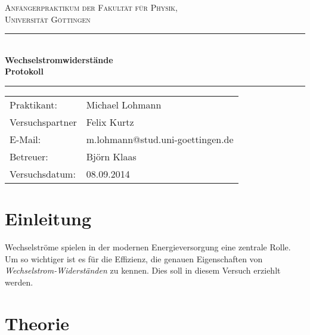\documentclass[12pt,a4paper,titlepage,headinclude,bibtotoc]{scrartcl}
\begin{document}
\begin{titlepage}
\centering
\textsc{\Large Anfängerpraktikum der Fakultät für
  Physik,\\[1.5ex] Universität Göttingen}

\vspace*{4.2cm}

\rule{\textwidth}{1pt}\\[0.5cm]
{\huge \bfseries
  Wechselstromwiderstände\\[1.5ex]
  Protokoll}\\[0.5cm]
\rule{\textwidth}{1pt}

\vspace*{2.5cm}

\begin{Large}
\begin{tabular}{ll}
Praktikant: &  Michael Lohmann\\
 Versuchspartner &  Felix Kurtz\\
 E-Mail: & m.lohmann@stud.uni-goettingen.de\\
 Betreuer: & Björn Klaas\\
 Versuchsdatum: & 08.09.2014\\
\end{tabular}
\end{Large}

\vspace*{0.8cm}

\begin{Large}
\end{Large}

\end{titlepage}

\tableofcontents

\newpage

\section{Einleitung}
\label{sec:einleitung}
Wechselströme spielen in der modernen Energieversorgung eine zentrale Rolle.
Um so wichtiger ist es für die Effizienz, die genauen Eigenschaften von \emph{Wechselstrom-Widerständen} zu kennen.
Dies soll in diesem Versuch erziehlt werden.
\section{Theorie}
\label{sec:theorie}
\end{document}
